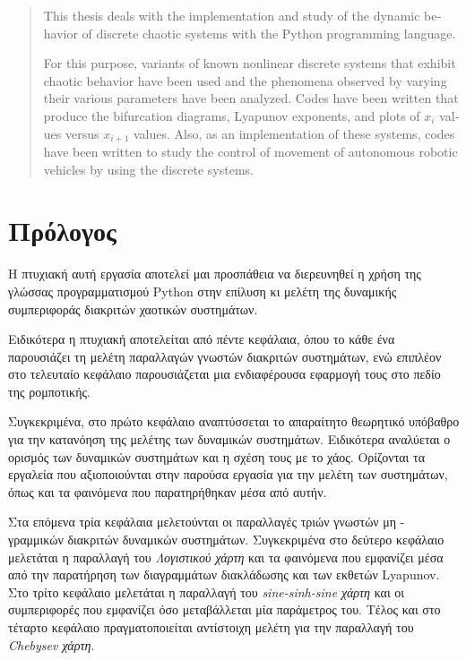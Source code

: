 \afterpage{\blankpage}
\begin{otherlanguage}{english} 
	\begin{abstract}
		This thesis deals with the implementation and study of the dynamic behavior of discrete chaotic systems with the Python programming language.
		
		For this purpose, variants of known nonlinear discrete systems that exhibit chaotic behavior have been used and the phenomena observed by varying their various parameters have been analyzed. Codes have been written that produce the bifurcation diagrams, Lyapunov exponents, and plots of $x_i$ values versus $x_{i+1}$ values. Also, as an implementation of these systems, codes have been written to study the control of movement of autonomous robotic vehicles by using the discrete systems.
		
		
	\end{abstract}
\end{otherlanguage}



\chapter*{Πρόλογος} 


Η πτυχιακή αυτή εργασία αποτελεί μαι προσπάθεια να διερευνηθεί η χρήση της γλώσσας προγραμματισμού Python στην επίλυση κι μελέτη της δυναμικής συμπεριφοράς διακριτών χαοτικών συστημάτων. 

Ειδικότερα η πτυχιακή αποτελείται από πέντε κεφάλαια, όπου το κάθε ένα παρουσιάζει τη μελέτη παραλλαγών γνωστών διακριτών συστημάτων, ενώ επιπλέον στο τελευταίο κεφάλαιο παρουσιάζεται μια ενδιαφέρουσα εφαρμογή τους στο πεδίο της ρομποτικής. 

Συγκεκριμένα, στο πρώτο κεφάλαιο αναπτύσσεται το απαραίτητο θεωρητικό υπόβαθρο για την κατανόηση της μελέτης των δυναμικών συστημάτων. Ειδικότερα αναλύεται ο ορισμός των δυναμικών συστημάτων και η σχέση τους με το χάος. Ορίζονται τα εργαλεία που αξιοποιούνται στην παρούσα εργασία για την μελέτη των συστημάτων, όπως και τα φαινόμενα που παρατηρήθηκαν μέσα από αυτήν.

Στα επόμενα τρία κεφάλαια μελετούνται οι παραλλαγές τριών γνωστών μη - γραμμικών διακριτών δυναμικών συστημάτων. Συγκεκριμένα στο δεύτερο κεφάλαιο μελετάται η παραλλαγή του \emph{Λογιστικού χάρτη} και τα φαινόμενα που εμφανίζει μέσα από την παρατήρηση των διαγραμμάτων διακλάδωσης και των εκθετών Lyapunov. Στο τρίτο κεφάλαιο μελετάται η παραλλαγή του \emph{sine-sinh-sine χάρτη} και οι συμπεριφορές που εμφανίζει όσο μεταβάλλεται μία παράμετρος του. Τέλος και στο τέταρτο κεφάλαιο πραγματοποιείται αντίστοιχη μελέτη για την παραλλαγή του \emph{Chebysev χάρτη}.

